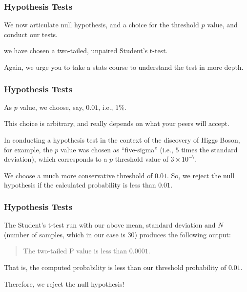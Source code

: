 \begin{frame}
\frametitle{Hypothesis Tests}
\begin{changemargin}{1cm}

We now articulate null hypothesis,
and a choice for the threshold $p$ value, and conduct our tests.

we have chosen a two-tailed, unpaired
Student's t-test. 

Again, we urge you to take a stats course
to understand the test in more depth.

\end{changemargin}
\end{frame}

\begin{frame}
\frametitle{Hypothesis Tests}
\begin{changemargin}{1cm}

As $p$ value, we choose, say, $0.01$, i.e., $1\%$. 

This choice
is arbitrary, and really depends on what your peers will accept.

In conducting a hypothesis test in the context of the discovery
of Higgs Boson, for example, the $p$ value was chosen as
``five-sigma'' (i.e., $5$ times the standard deviation), which
corresponds to a $p$ threshold value of $3\times 10^{-7}$.

We choose a much more conservative threshold of $0.01$.
So, we reject the null hypothesis if the calculated probability
is less than $0.01$.


\end{changemargin}
\end{frame}

\begin{frame}
\frametitle{Hypothesis Tests}
\begin{changemargin}{1cm}

The Student's t-test run with our above mean, standard deviation
and $N$ (number of samples, which in our case is $30$) produces
the following output:
\begin{quote}
    The two-tailed P value is less than $0.0001$.
\end{quote}

That is, the computed probability is less than our threshold
probability of $0.01$.

 Therefore, we reject the null hypothesis!

\end{changemargin}
\end{frame}

